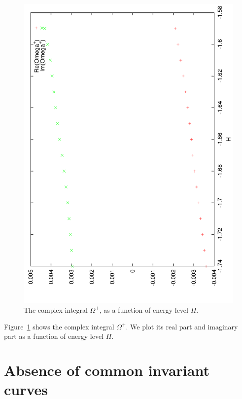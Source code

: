 \documentclass[a4paper]{amsart}
\theoremstyle{remark}
\begin{document}
\begin{figure}
\includegraphics[angle=-90,width=\textwidth]{figs/Omega}
\caption{The complex integral $\Omega^+$, as a function of energy level
$H$.}
\label{fig:Omega}
\end{figure}

Figure~\ref{fig:Omega} shows the complex integral $\Omega^+$. We plot
its real part and imaginary part as a function of energy level $H$.

\section{Absence of common invariant curves}
\end{document}
